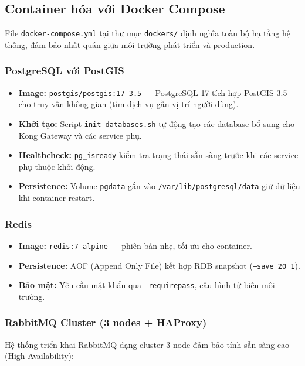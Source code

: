 \subsection{Container hóa với Docker Compose}

File \texttt{docker-compose.yml} tại thư mục \texttt{dockers/} định nghĩa toàn bộ hạ tầng hệ thống, đảm bảo nhất quán giữa môi trường phát triển và production.

\subsubsection{PostgreSQL với PostGIS}

\begin{itemize}
    \item \textbf{Image:} \texttt{postgis/postgis:17-3.5} — PostgreSQL 17 tích hợp PostGIS 3.5 cho truy vấn không gian (tìm dịch vụ gần vị trí người dùng).
    \item \textbf{Khởi tạo:} Script \texttt{init-databases.sh} tự động tạo các database bổ sung cho Kong Gateway và các service phụ.
    \item \textbf{Healthcheck:} \texttt{pg\_isready} kiểm tra trạng thái sẵn sàng trước khi các service phụ thuộc khởi động.
    \item \textbf{Persistence:} Volume \texttt{pgdata} gắn vào \texttt{/var/lib/postgresql/data} giữ dữ liệu khi container restart.
\end{itemize}

\subsubsection{Redis}

\begin{itemize}
    \item \textbf{Image:} \texttt{redis:7-alpine} — phiên bản nhẹ, tối ưu cho container.
    \item \textbf{Persistence:} AOF (Append Only File) kết hợp RDB snapshot (\texttt{--save 20 1}).
    \item \textbf{Bảo mật:} Yêu cầu mật khẩu qua \texttt{--requirepass}, cấu hình từ biến môi trường.
\end{itemize}

\subsubsection{RabbitMQ Cluster (3 nodes + HAProxy)}

Hệ thống triển khai RabbitMQ dạng cluster 3 node đảm bảo tính sẵn sàng cao (High Availability):

